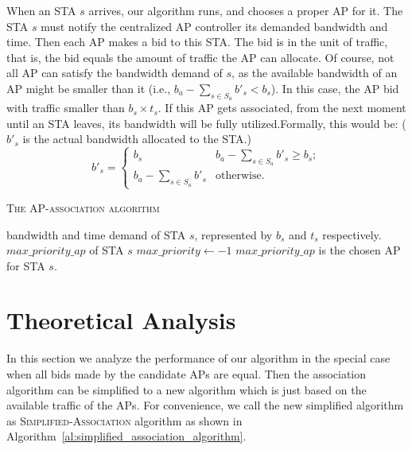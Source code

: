 \documentclass[conference]{IEEEtran}
\begin{document}
   When an STA $s$ arrives, our algorithm runs, and chooses a proper AP for it. The STA $s$ must notify the centralized AP controller its demanded bandwidth and time. Then each AP makes a bid to this STA. The bid is in the unit of traffic, that is, the bid equals the amount of traffic the AP can allocate. Of course, not all AP can satisfy the bandwidth demand of $s$, as the available bandwidth of an AP might be smaller than it (i.e., $b_a-\sum_{s \in S_a}{b'_s} < b_s$). In this case, the AP bid with traffic smaller than $b_s \times t_s$. If this AP gets associated, from the next moment until an STA leaves, its bandwidth will be fully utilized.Formally, this would be: ($b'_s$ is the actual bandwidth allocated to the STA.)
  \begin{displaymath}
    b'_s = \begin{cases}
      b_s & b_a-\sum_{s \in S_a}{b'_s} \ge b_s; \\
      b_a-\sum_{s \in S_a}{b'_s} & \text{otherwise.}
    \end{cases}
  \end{displaymath}


    \begin{algorithm}[htb]
    \caption{\textsc{The AP-association algorithm}}\label{al:ap_association_algorithm}
    \begin{algorithmic}[1]
        \REQUIRE bandwidth and time demand of STA $s$, represented by
        $b_s$ and $t_s$
        respectively.
        \ENSURE $max\_priority\_ap$ of STA $s$
        \STATE $max\_priority \leftarrow -1$
        \ENDIF
        \ENDFOR
        \STATE $max\_priority\_ap$ is the chosen AP for STA $s$.
    \end{algorithmic}
  \end{algorithm}



  \section{Theoretical Analysis}\label{sec:analysis}
  In this section we analyze the performance of our algorithm in the special case when all bids made by the candidate APs are equal.  Then the association algorithm can be simplified to a new  algorithm which is just based on the available traffic of the APs. For convenience, we call the new simplified algorithm as \textsc{Simplified-Association} algorithm as shown in Algorithm~\ref{al:simplified_association_algorithm}.
\end{document}
